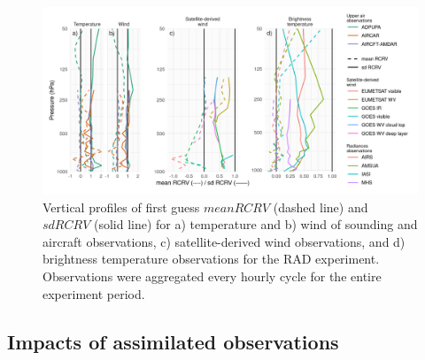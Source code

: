 \documentclass[final,5p,times,twocolumn,authoryear]{elsarticle} %
\begin{document}
\begin{figure}
\includegraphics{../figures/rcrv-profile-1} \caption{Vertical profiles of first guess \(mean RCRV\) (dashed line) and \(sd RCRV\) (solid line) for a) temperature and b) wind of sounding and aircraft observations, c) satellite-derived wind observations, and d) brightness temperature observations for the RAD experiment. Observations were aggregated every hourly cycle for the entire experiment period.}\label{fig:rcrv-profile}
\end{figure}

\hypertarget{impacts-of-assimilated-observations}{%
\subsection{Impacts of assimilated observations}\label{impacts-of-assimilated-observations}}
\end{document}

